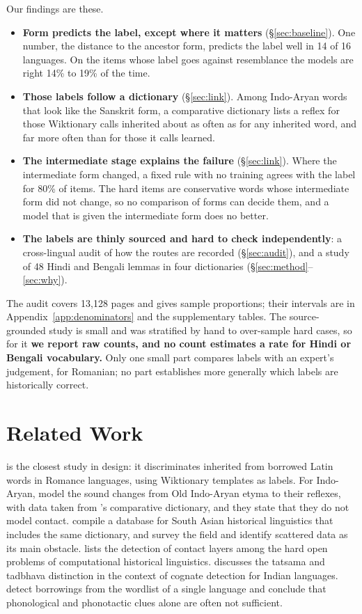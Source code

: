 \documentclass[11pt]{article}
\begin{document}
Our findings are these.
\begin{itemize}
\item \textbf{Form predicts the label, except where it matters} (\S\ref{sec:baseline}). One number, the distance to the ancestor form, predicts the label well in 14 of 16 languages. On the items whose label goes against resemblance the models are right 14\% to 19\% of the time.
\item \textbf{Those labels follow a dictionary} (\S\ref{sec:link}). Among Indo-Aryan words that look like the Sanskrit form, a comparative dictionary lists a reflex for those Wiktionary calls inherited about as often as for any inherited word, and far more often than for those it calls learned.
\item \textbf{The intermediate stage explains the failure} (\S\ref{sec:link}). Where the intermediate form changed, a fixed rule with no training agrees with the label for 80\% of items. The hard items are conservative words whose intermediate form did not change, so no comparison of forms can decide them, and a model that is given the intermediate form does no better.
\item \textbf{The labels are thinly sourced and hard to check independently}: a cross-lingual audit of how the routes are recorded (\S\ref{sec:audit}), and a study of 48 Hindi and Bengali lemmas in four dictionaries (\S\ref{sec:method}--\ref{sec:why}).
\end{itemize}
The audit covers 13,128 pages and gives sample proportions; their intervals are in Appendix~\ref{app:denominators} and the supplementary tables. The source-grounded study is small and was stratified by hand to over-sample hard cases, so for it \textbf{we report raw counts, and no count estimates a rate for Hindi or Bengali vocabulary.} Only one small part compares labels with an expert's judgement, for Romanian; no part establishes more generally which labels are historically correct.

\section{Related Work}

\citet{cristea2021inherited} is the closest study in design: it discriminates inherited from borrowed Latin words in Romance languages, using Wiktionary templates as labels. For Indo-Aryan, \citet{cathcart2020disentangling} model the sound changes from Old Indo-Aryan etyma to their reflexes, with data taken from \citeauthor{turner1966cdial}'s comparative dictionary, and they state that they do not model contact. \citet{arora2023jambu} compile a database for South Asian historical linguistics that includes the same dictionary, and \citet{arora2022computational} survey the field and identify scattered data as its main obstacle. \citet{list2024openproblems} lists the detection of contact layers among the hard open problems of computational historical linguistics. \citet[\S4.1]{kanojia2021thesis} discusses the tatsama and tadbhava distinction in the context of cognate detection for Indian languages. \citet{miller2020lexical} detect borrowings from the wordlist of a single language and conclude that phonological and phonotactic clues alone are often not sufficient.
\end{document}
